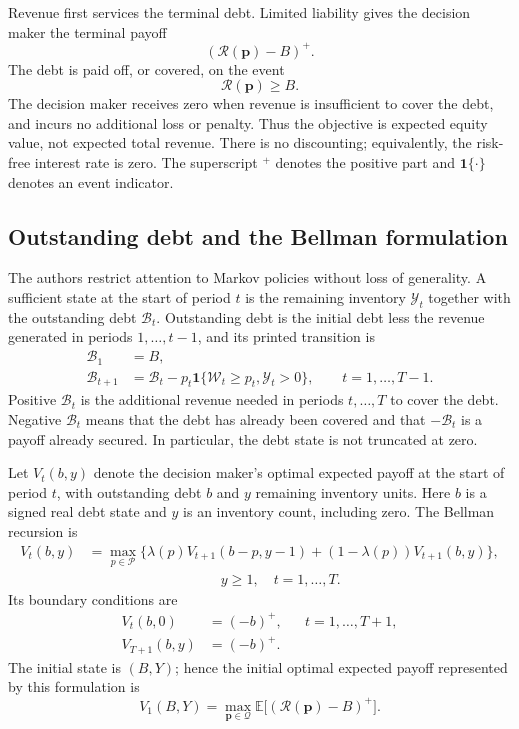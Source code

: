 \documentclass{article}
\begin{document}
Revenue first services the terminal debt. Limited liability gives the decision maker the terminal payoff
\[
(\mathcal R(\mathbf p)-B)^+.
\]
The debt is paid off, or covered, on the event
\[
\mathcal R(\mathbf p)\ge B.
\]
The decision maker receives zero when revenue is insufficient to cover the debt, and incurs no additional loss or penalty. Thus the objective is expected equity value, not expected total revenue. There is no discounting; equivalently, the risk-free interest rate is zero. The superscript \({}^+\) denotes the positive part and \(\mathbf 1\{\cdot\}\) denotes an event indicator.

\subsection*{Outstanding debt and the Bellman formulation}

The authors restrict attention to Markov policies without loss of generality. A sufficient state at the start of period \(t\) is the remaining inventory \(\mathcal Y_t\) together with the outstanding debt \(\mathcal B_t\). Outstanding debt is the initial debt less the revenue generated in periods \(1,\ldots,t-1\), and its printed transition is
\[
\begin{aligned}
\mathcal B_1&=B,\\
\mathcal B_{t+1}
&=\mathcal B_t-p_t\mathbf 1\{\mathcal W_t\ge p_t,\mathcal Y_t>0\},
\qquad t=1,\ldots,T-1.
\end{aligned}
\]
Positive \(\mathcal B_t\) is the additional revenue needed in periods \(t,\ldots,T\) to cover the debt. Negative \(\mathcal B_t\) means that the debt has already been covered and that \(-\mathcal B_t\) is a payoff already secured. In particular, the debt state is not truncated at zero.

Let \(V_t(b,y)\) denote the decision maker's optimal expected payoff at the start of period \(t\), with outstanding debt \(b\) and \(y\) remaining inventory units. Here \(b\) is a signed real debt state and \(y\) is an inventory count, including zero. The Bellman recursion is
\begin{equation}
\begin{aligned}
V_t(b,y)
&=\max_{p\in\mathcal P}
\bigl\{\lambda(p)V_{t+1}(b-p,y-1)
 +(1-\lambda(p))V_{t+1}(b,y)\bigr\},\\
&\hspace{4cm}y\ge1,\quad t=1,\ldots,T.
\end{aligned}
\tag{2}
\end{equation}
Its boundary conditions are
\begin{equation}
\begin{aligned}
V_t(b,0)&=(-b)^+,
&&t=1,\ldots,T+1,\\
V_{T+1}(b,y)&=(-b)^+.
\end{aligned}
\tag{3}
\end{equation}
The initial state is \((B,Y)\); hence the initial optimal expected payoff represented by this formulation is
\[
V_1(B,Y)=\max_{\mathbf p\in\mathcal Q}
\mathbb E\bigl[(\mathcal R(\mathbf p)-B)^+\bigr].
\]
\end{document}
